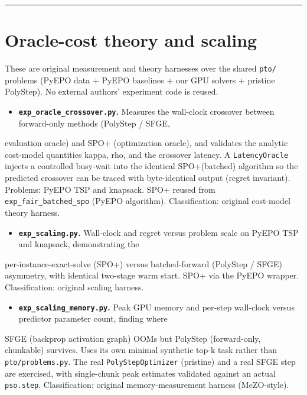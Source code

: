 \documentclass[10pt]{article}
\begin{document}
\medskip\hrule\medskip

\section*{Oracle-cost theory and scaling}

These are original measurement and theory harnesses over the shared \texttt{pto/} problems (PyEPO data + PyEPO baselines +
our GPU solvers + pristine PolyStep). No external authors' experiment code is reused.

\begin{itemize}\setlength{\itemsep}{2pt}
\item \textbf{\texttt{exp\_oracle\_crossover.py}.} Measures the wall-clock crossover between forward-only methods (PolyStep / SFGE,
\end{itemize}
  evaluation oracle) and SPO+ (optimization oracle), and validates the analytic cost-model quantities kappa, rho, and
  the crossover latency. A \texttt{LatencyOracle} injects a controlled busy-wait into the identical SPO+(batched) algorithm so
  the predicted crossover can be traced with byte-identical output (regret invariant). Problems: PyEPO TSP and knapsack.
  SPO+ reused from \texttt{exp\_fair\_batched\_spo} (PyEPO algorithm). Classification: original cost-model theory harness.

\begin{itemize}\setlength{\itemsep}{2pt}
\item \textbf{\texttt{exp\_scaling.py}.} Wall-clock and regret versus problem scale on PyEPO TSP and knapsack, demonstrating the
\end{itemize}
  per-instance-exact-solve (SPO+) versus batched-forward (PolyStep / SFGE) asymmetry, with identical two-stage warm
  start. SPO+ via the PyEPO wrapper. Classification: original scaling harness.

\begin{itemize}\setlength{\itemsep}{2pt}
\item \textbf{\texttt{exp\_scaling\_memory.py}.} Peak GPU memory and per-step wall-clock versus predictor parameter count, finding where
\end{itemize}
  SFGE (backprop activation graph) OOMs but PolyStep (forward-only, chunkable) survives. Uses its own minimal synthetic
  top-k task rather than \texttt{pto/problems.py}. The real \texttt{PolyStepOptimizer} (pristine) and a real SFGE step are exercised,
  with single-chunk peak estimates validated against an actual \texttt{pso.step}. Classification: original memory-measurement
  harness (MeZO-style).
\end{document}
